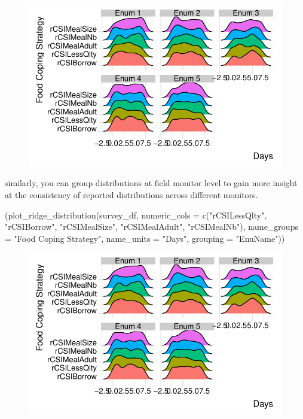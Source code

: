 \documentclass[
  letterpaper,
  DIV=11,
  numbers=noendperiod]{scrreprt}
\newenvironment{Shaded}{\begin{snugshade}}{\end{snugshade}}
\newcommand{\AttributeTok}[1]{\textcolor[rgb]{0.40,0.45,0.13}{#1}}
\newcommand{\FunctionTok}[1]{\textcolor[rgb]{0.28,0.35,0.67}{#1}}
\newcommand{\NormalTok}[1]{\textcolor[rgb]{0.00,0.23,0.31}{#1}}
\newcommand{\StringTok}[1]{\textcolor[rgb]{0.13,0.47,0.30}{#1}}
\begin{document}
\begin{figure}[H]

{\centering \includegraphics{chapter_two_files/figure-pdf/unnamed-chunk-11-1.pdf}

}

\end{figure}

similarly, you can group distributions at field monitor level to gain
more insight at the consistency of reported distributions across
different monitors.

\begin{Shaded}
\begin{Highlighting}[]
\NormalTok{(}\FunctionTok{plot\_ridge\_distribution}\NormalTok{(survey\_df, }\AttributeTok{numeric\_cols =} \FunctionTok{c}\NormalTok{(}\StringTok{"rCSILessQlty"}\NormalTok{, }\StringTok{"rCSIBorrow"}\NormalTok{, }\StringTok{"rCSIMealSize"}\NormalTok{, }\StringTok{"rCSIMealAdult"}\NormalTok{, }\StringTok{"rCSIMealNb"}\NormalTok{),}
                         \AttributeTok{name\_groups =} \StringTok{"Food Coping Strategy"}\NormalTok{, }\AttributeTok{name\_units =} \StringTok{"Days"}\NormalTok{, }\AttributeTok{grouping =} \StringTok{"EnuName"}\NormalTok{))}
\end{Highlighting}
\end{Shaded}

\begin{figure}[H]

{\centering \includegraphics{chapter_two_files/figure-pdf/unnamed-chunk-12-1.pdf}

}

\end{figure}
\end{document}
